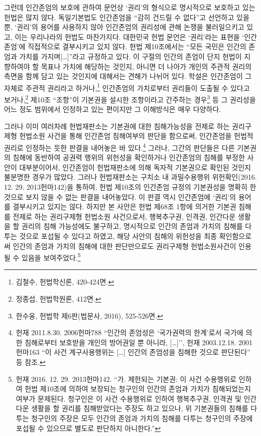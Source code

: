 그런데 인간존엄의 보호에 관하여 문언상 `권리'의 형식으로 명시적으로 보호하고 있는 헌법은 많지 않다. 독일기본법도 인간존엄을 ``감히 건드릴 수 없다''고 선언하고 있을 뿐, `권리'의 용어를 사용하지 않아 인간존엄의 권리성에 관해 논쟁을 불러일으키고 있고, 이는 우리나라의 헌법도 마찬가지다. 대한민국 헌법 문언은 `권리'라는 표현을 `인간존엄'에 직접적으로 결부시키고 있지 않다. 헌법 제10조에서는 ``모든 국민은 인간의 존엄과 가치를 가지며{[}\ldots{]}''라고 규정하고 있다. 이 구절의 인간의 존엄이 단지 헌법이 지향하여야 할 목표나 가치에 해당하는 것인지, 아니면 더 나아가 개인의 주관적 권리의 측면을 함께 담고 있는 것인지에 대해서는 견해가 나뉘어 있다. 학설은 인간존엄이 그 자체로 주관적 권리라고 하거나,\footnote{김철수, 헌법학신론, 420-424면.} 인간존엄의 가치로부터 권리들이 도출될 수 있다고 보거나,\footnote{정종섭, 헌법학원론, 412면.} 제10조 ``조항''이 기본권을 설시한 조항이라고 간주하는 경우\footnote{한수웅, 헌법학 제6판(법문사, 2016), 525-526면.} 등 그 권리성을 어느 정도 범위에서 인정하고 있는 편이지만 그 이해방식은 매우 다양하다.

그러나 이미 여러차례 헌법재판소는 기본권에 대한 침해가능성을 전제로 하는 권리구제형 헌법소원 사건을 통해 인간존엄 침해여부의 판단을 함으로써, 인간존엄을 헌법적 권리로 인정하는 듯한 판결을 내어놓은 바 있다.\footnote{헌재 2011.8.30. 2006헌마788 ``인간의 존엄성은 `국가권력의 한계'로서 국가에 의한 침해로부터 보호받을 개인의 방어권일 뿐 아니라, {[}\ldots{]}'', 헌재 2003.12.18. 2001헌마163 ``이 사건 계구사용행위는 {[}\ldots{]} 인간의 존엄성을 침해한 것으로 판단된다'' 등 참조.} 그러나, 그간의 판단들은 다른 기본권의 침해에 동반하여 공권력 행위의 위헌성을 확인하거나 인간존엄의 침해를 부정한 사안이 대부분이어서, 인간존엄이 헌법재판소에 의해 독자적 기본권으로 확인된 것인지 불분명한 경우가 많았다. 그러나 헌법재판소는 구치소 내 과밀수용행위 위헌확인(2016. 12. 29. 2013헌마142)을 통하여, 헌법 제10조의 인간존엄 규정의 기본권성을 명확히 한 것으로 보지 않을 수 없는 판결을 내어놓았다. 이 판결 역시 인간존엄에 `권리'의 용어를 결부시키고 있지는 않다. 하지만 본 사안은 헌법 제68조 1항에 의거한 기본권 침해를 전제로 하는 권리구제형 헌법소원 사건으로서, 행복추구권, 인격권, 인간다운 생활을 할 권리의 침해 가능성에도 불구하고, 명시적으로 인간의 존엄과 가치의 침해를 다투는 것으로 포섭될 수 있다고 하였고, 해당 사안의 침해의 위헌성을 최종 확인함으로써 인간의 존엄과 가치의 침해에 대한 판단만으로도 권리구제형 헌법소원사건이 인용될 수 있음을 보여주었다.\footnote{헌재 2016. 12. 29. 2013헌마142. ``가. 제한되는 기본권: 이 사건 수용행위로 인하여 헌법 제10조에 의하여 보장되는 청구인의 인간의 존엄과 가치가 침해되었는지 여부가 문제된다. 청구인은 이 사건 수용행위로 인하여 행복추구권, 인격권 및 인간다운 생활을 할 권리를 침해받았다는 주장도 하고 있으나, 위 기본권들의 침해를 다투는 청구인의 주장은 모두 인간의 존엄과 가치의 침해를 다투는 청구인의 주장에 포섭될 수 있으므로 별도로 판단하지 아니한다.''}

